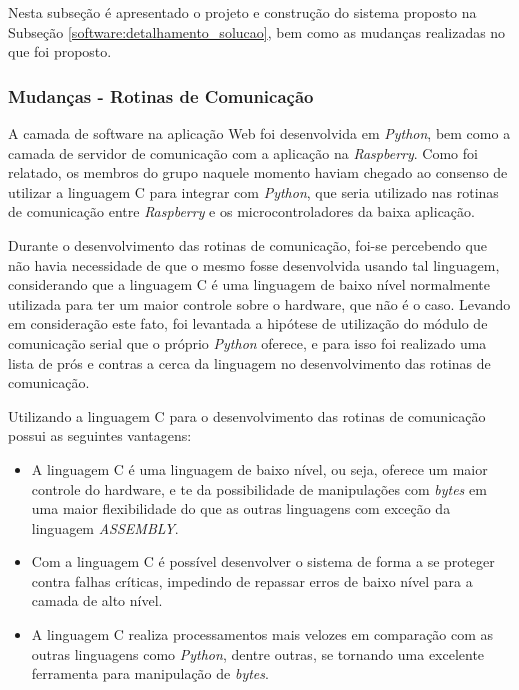 Nesta subseção é apresentado o projeto e construção do sistema proposto na Subseção \ref{software:detalhamento_solucao}, bem
como as mudanças realizadas no que foi proposto.

\subsubsection*{\textbf{Mudanças - Rotinas de Comunicação}}

A camada de software na aplicação Web foi desenvolvida em \textit{Python}, bem como a camada de servidor de comunicação com a aplicação na 
\textit{Raspberry}. Como foi relatado, os membros do grupo naquele momento haviam chegado ao consenso de utilizar a linguagem C para integrar 
com \textit{Python}, que seria utilizado nas rotinas de comunicação entre \textit{Raspberry} e os microcontroladores da baixa aplicação.

Durante o desenvolvimento das rotinas de comunicação, foi-se percebendo que não havia necessidade de que o mesmo fosse desenvolvida 
usando tal linguagem, considerando que a linguagem C é uma linguagem de baixo nível normalmente utilizada para ter um maior controle sobre o 
hardware, que não é o caso. Levando em consideração este fato, foi levantada a hipótese de utilização do módulo de comunicação serial que o próprio 
\textit{Python} oferece, e para isso foi realizado uma lista de prós e contras a cerca da linguagem no desenvolvimento das rotinas de comunicação.

Utilizando a linguagem C para o desenvolvimento das rotinas de comunicação possui as seguintes vantagens:

\begin{itemize}
    \item A linguagem C é uma linguagem de baixo nível, ou seja, oferece um maior controle do hardware, e te da possibilidade de manipulações com \textit{bytes} em uma maior flexibilidade do que as outras linguagens com exceção da linguagem \textit{ASSEMBLY}.
    \item Com a linguagem C é possível desenvolver o sistema de forma a se proteger contra falhas críticas, impedindo de repassar erros de baixo nível para a camada de alto nível.
    \item A linguagem C realiza processamentos mais velozes em comparação com as outras linguagens como \textit{Python}, dentre outras, se tornando uma excelente ferramenta para manipulação de \textit{bytes}.
\end{itemize}

